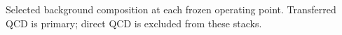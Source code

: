 Selected background composition at each frozen operating point. Transferred QCD is primary; direct QCD is excluded from these stacks.
